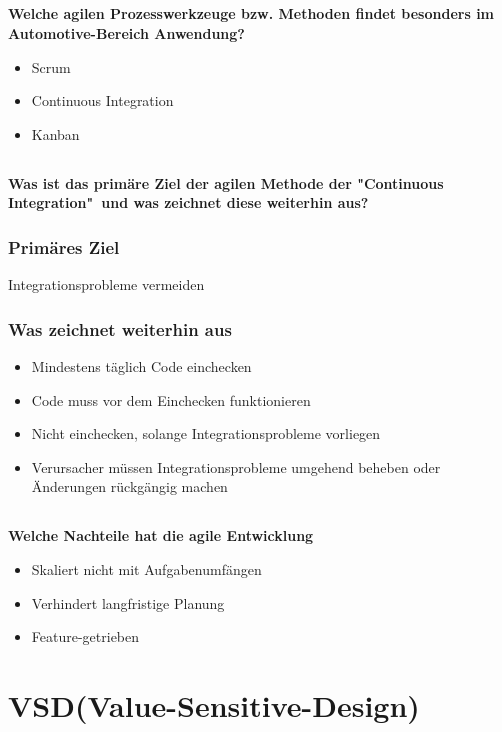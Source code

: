 \subsection{}
\textbf{Welche agilen Prozesswerkzeuge bzw. Methoden findet besonders im Automotive-Bereich Anwendung?}
\begin{itemize}
    \item Scrum
    \item Continuous Integration
    \item Kanban
\end{itemize}

\subsection{}
\textbf{Was ist das primäre Ziel der agilen Methode der "Continuous Integration"\ und was zeichnet diese weiterhin aus?}
\subsubsection{Primäres Ziel}
Integrationsprobleme vermeiden
\subsubsection{Was zeichnet weiterhin aus}
\begin{itemize}
    \item Mindestens täglich Code einchecken
    \item Code muss vor dem Einchecken funktionieren
    \item Nicht einchecken, solange Integrationsprobleme vorliegen
    \item Verursacher müssen Integrationsprobleme umgehend beheben oder Änderungen rückgängig machen
\end{itemize}

\subsection{}
\textbf{Welche Nachteile hat die agile Entwicklung}
\begin{itemize}
    \item Skaliert nicht mit Aufgabenumfängen
    \item Verhindert langfristige Planung
    \item Feature-getrieben
\end{itemize}

\section{VSD(Value-Sensitive-Design)}
